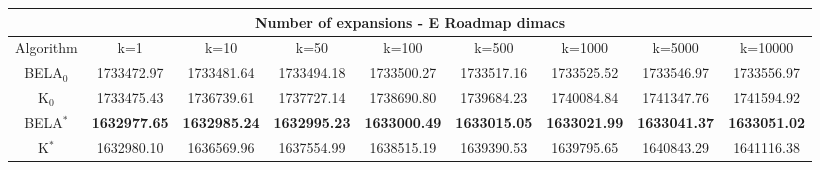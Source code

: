 \begin{tabular}{c|cccccccc}\toprule
\multicolumn{9}{c}{Number of expansions - E Roadmap dimacs}\\ \midrule
Algorithm & k=1 & k=10 & k=50 & k=100 & k=500 & k=1000 & k=5000 & k=10000 \\ \midrule
BELA$_0$ & 1733472.97 & 1733481.64 & 1733494.18 & 1733500.27 & 1733517.16 & 1733525.52 & 1733546.97 & 1733556.97 \\
K$_0$ & 1733475.43 & 1736739.61 & 1737727.14 & 1738690.80 & 1739684.23 & 1740084.84 & 1741347.76 & 1741594.92 \\
BELA$^*$ & \textbf{1632977.65} & \textbf{1632985.24} & \textbf{1632995.23} & \textbf{1633000.49} & \textbf{1633015.05} & \textbf{1633021.99} & \textbf{1633041.37} & \textbf{1633051.02} \\
K$^*$ & 1632980.10 & 1636569.96 & 1637554.99 & 1638515.19 & 1639390.53 & 1639795.65 & 1640843.29 & 1641116.38 \\ \bottomrule 
\end{tabular}
